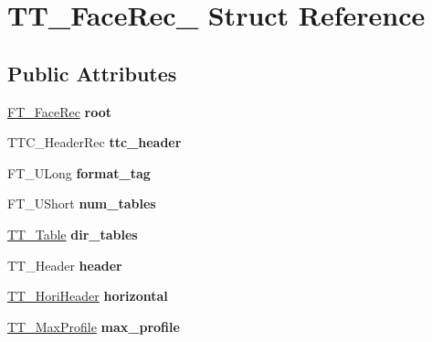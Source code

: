 \hypertarget{struct_t_t___face_rec__}{
\section{TT\_\-FaceRec\_\- Struct Reference}
\label{struct_t_t___face_rec__}
}
\subsection*{Public Attributes}
\begin{DoxyCompactItemize}
\item 
\hypertarget{struct_t_t___face_rec___ab07a1f6ce2cffe73a5501fb33164ae74}{
\hyperlink{struct_f_t___face_rec__}{FT\_\-FaceRec} {\bfseries root}}
\label{struct_t_t___face_rec___ab07a1f6ce2cffe73a5501fb33164ae74}

\item 
\hypertarget{struct_t_t___face_rec___a9cde4ce9550411379eef0791afef8943}{
TTC\_\-HeaderRec {\bfseries ttc\_\-header}}
\label{struct_t_t___face_rec___a9cde4ce9550411379eef0791afef8943}

\item 
\hypertarget{struct_t_t___face_rec___ae492c009d7c3dd1b7279f6596edb84af}{
FT\_\-ULong {\bfseries format\_\-tag}}
\label{struct_t_t___face_rec___ae492c009d7c3dd1b7279f6596edb84af}

\item 
\hypertarget{struct_t_t___face_rec___aa32df24e9bbbbc72117bfeb964028b6e}{
FT\_\-UShort {\bfseries num\_\-tables}}
\label{struct_t_t___face_rec___aa32df24e9bbbbc72117bfeb964028b6e}

\item 
\hypertarget{struct_t_t___face_rec___ae4480c53c6414c74919fc99c9192adfe}{
\hyperlink{struct_t_t___table_rec__}{TT\_\-Table} {\bfseries dir\_\-tables}}
\label{struct_t_t___face_rec___ae4480c53c6414c74919fc99c9192adfe}

\item 
\hypertarget{struct_t_t___face_rec___ac5fc04850d7b223029891601ed605b34}{
TT\_\-Header {\bfseries header}}
\label{struct_t_t___face_rec___ac5fc04850d7b223029891601ed605b34}

\item 
\hypertarget{struct_t_t___face_rec___a784d2ca39e9717da0661f5fd59dffc58}{
\hyperlink{struct_t_t___hori_header__}{TT\_\-HoriHeader} {\bfseries horizontal}}
\label{struct_t_t___face_rec___a784d2ca39e9717da0661f5fd59dffc58}

\item 
\hypertarget{struct_t_t___face_rec___a1bacbea2875d5fda567a5f561773035d}{
\hyperlink{struct_t_t___max_profile__}{TT\_\-MaxProfile} {\bfseries max\_\-profile}}
\label{struct_t_t___face_rec___a1bacbea2875d5fda567a5f561773035d}


\end{DoxyCompactItemize}
